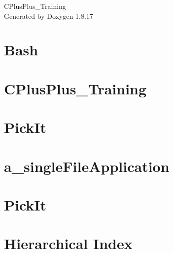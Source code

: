 \let\mypdfximage\pdfximage\def\pdfximage{\immediate\mypdfximage}\documentclass[twoside]{book}
\newcommand{\+}{\discretionary{\mbox{\scriptsize$\hookleftarrow$}}{}{}}
\newcommand{\clearemptydoublepage}{%
  \newpage{\pagestyle{empty}\cleardoublepage}%
}
\begin{document}
\hypersetup{pageanchor=false,
             bookmarksnumbered=true,
             pdfencoding=unicode
            }
\begin{titlepage}
\vspace*{7cm}
\begin{center}%
{\Large C\+Plus\+Plus\+\_\+\+Training }\\
\vspace*{1cm}
{\large Generated by Doxygen 1.8.17}\\
\end{center}
\end{titlepage}
\clearemptydoublepage
{}
\tableofcontents
\clearemptydoublepage
{}
\hypersetup{pageanchor=true}

\chapter{Bash}
\label{md_doc_tutorialLinks_links}

\chapter{C\+Plus\+Plus\+\_\+\+Training}
\label{md_README}

\chapter{Pick\+It}
\label{md_source_makefiles_cmakeExample_mediumMake_README}

\chapter{a\+\_\+single\+File\+Application}
\label{md_source_makefiles_cmakeExample_StartingPoint}

\chapter{Pick\+It}
\label{md_source_makefiles_makeExample_mediumMake_README}

\chapter{Hierarchical Index}

\end{document}
